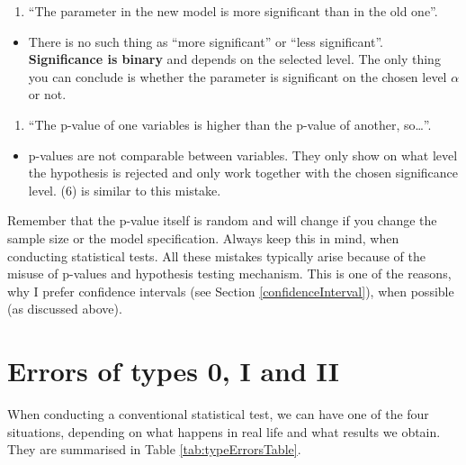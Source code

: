 \documentclass[
]{book}
\providecommand{\tightlist}{%
  \setlength{\itemsep}{0pt}\setlength{\parskip}{0pt}}
\theoremstyle{definition}
\theoremstyle{definition}
\theoremstyle{definition}
\theoremstyle{definition}
\theoremstyle{remark}
\begin{document}
\begin{enumerate}
\def\labelenumi{\arabic{enumi}.}
\setcounter{enumi}{6}
\tightlist
\item
  ``The parameter in the new model is more significant than in the old one''.
\end{enumerate}

\begin{itemize}
\tightlist
\item
  There is no such thing as ``more significant'' or ``less significant''. \textbf{Significance is binary} and depends on the selected level. The only thing you can conclude is whether the parameter is significant on the chosen level \(\alpha\) or not.
\end{itemize}

\begin{enumerate}
\def\labelenumi{\arabic{enumi}.}
\setcounter{enumi}{7}
\tightlist
\item
  ``The p-value of one variables is higher than the p-value of another, so\ldots{}''.
\end{enumerate}

\begin{itemize}
\tightlist
\item
  p-values are not comparable between variables. They only show on what level the hypothesis is rejected and only work together with the chosen significance level. (6) is similar to this mistake.
\end{itemize}

Remember that the p-value itself is random and will change if you change the sample size or the model specification. Always keep this in mind, when conducting statistical tests. All these mistakes typically arise because of the misuse of p-values and hypothesis testing mechanism. This is one of the reasons, why I prefer confidence intervals (see Section \ref{confidenceInterval}), when possible (as discussed above).

\section{Errors of types 0, I and II}\label{typeErrors}

When conducting a conventional statistical test, we can have one of the four situations, depending on what happens in real life and what results we obtain. They are summarised in Table \ref{tab:typeErrorsTable}.
\end{document}
